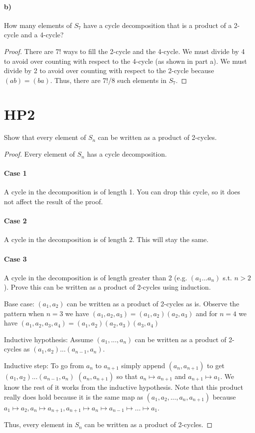 \documentclass{article}
\begin{document}
\paragraph{b)}
How many elements of $S_7$ have a cycle decomposition that is a product of a 2-cycle and a 4-cycle?
\begin{proof}
There are 7! ways to fill the 2-cycle and the 4-cycle. We must divide by 4 to avoid over counting with respect to the 4-cycle (as shown in part a). We must divide by 2 to avoid over counting with respect to the 2-cycle because $(ab)=(ba)$. Thus, there are 7!/8 such elements in $S_7$.
\end{proof}

\section{HP2}
Show that every element of $S_n$ can be written as a product of 2-cycles.
\begin{proof}
Every element of $S_n$ has a cycle decomposition.
\paragraph{Case 1}
A cycle in the decomposition is of length 1. You can drop this cycle, so it does not affect the result of the proof.
\paragraph{Case 2}
A cycle in the decomposition is of length 2. This will stay the same.
\paragraph{Case 3}
A cycle in the decomposition is of length greater than 2 (e.g. $(a_1...a_n)$ s.t. $n > 2$). Prove this can be written as a product of 2-cycles using induction.

Base case: $(a_1, a_2)$ can be written as a product of 2-cycles as is. Observe the pattern when $n=3$ we have $(a_1, a_2, a_3) = (a_1,a_2)(a_2,a_3)$ and for $n=4$ we have $(a_1, a_2, a_3, a_4) = (a_1,a_2)(a_2,a_3)(a_3, a_4)$

Inductive hypothesis: Assume $(a_1,...,a_n)$ can be written as a product of 2-cycles as $(a_1, a_2)...(a_{n-1}, a_n)$. 

Inductive step: To go from $a_n$ to $a_{n+1}$ simply append $(a_n, a_{n+1})$ to get $(a_1, a_2)...(a_{n-1}, a_n)$ $(a_n, a_{n+1})$ so that $a_n \mapsto a_{n+1}$ and $a_{n+1} \mapsto a_1$. We know the rest of it works from the inductive hypothesis. 
Note that this product really does hold because it is the same map as $(a_1,a_2,...,a_n, a_{n+1})$ because $a_1 \mapsto a_2, a_n \mapsto a_{n+1}, a_{n+1} \mapsto a_n \mapsto a_{n-1} \mapsto ... \mapsto a_1$. 

Thus, every element in $S_n$ can be written as a product of 2-cycles.

\end{proof}
\end{document}
